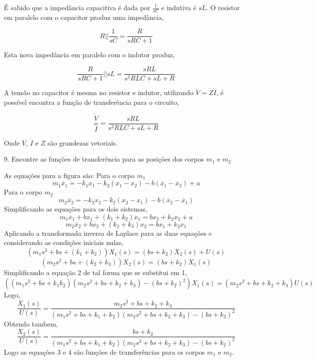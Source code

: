 \documentclass[paper=a4, fontsize=11pt]{article}
\begin{document}
É sabido que a impedância capacitiva é dada por $\frac{1}{s C}$ e indutiva é $s L $. O resistor
em paralelo com o capacitor produz uma impedância,

$$
R || \frac{1}{s C} = \frac{R}{s R C + 1}
$$

Esta nova impedância em paralelo com o indutor produz,

$$
\frac{R}{s R C + 1} || s L = \frac{s R L}{s^2 R L C + s L + R}
$$

A tensão no capacitor é mesma no resistor e indutor, utilizando $\dot{V}=\dot{Z}\dot{I}$,
é possível encontra a função de transferência para o circuito,

$$
\frac{\dot{V}}{\dot{I}} = \frac{s R L}{s^2 R L C + s L + R}
$$

Onde $\dot{V}$, $\dot{I}$ e $\dot{Z}$ são grandezas vetoriais.

\newpage

9. Encontre as funções de transferência para as posições dos corpos $m_1$ e $m_2$ 

As equações para a figura são:
Para o corpo $m_1$
$$
m_1 \ddot{x_1} = - k_1 x_1 - k_2(x_1 - x_2) - b(\dot{x_1} - \dot{x_2}) + u
$$
Para o corpo $m_2$
$$
m_2 \ddot{x_2} = -k_3 x_2 - k_2(x_2-x_1) - b(\dot{x_2} - \dot{x_1})
$$
Simplificando as equações para os dois sistemas,
$$
m_1 \ddot{x_1} + b \dot{x_1} + (k_1 + k_2) x_1 = b \dot{x_2} + k_2 x_2 + u
$$
$$
m_2 \ddot{x_2} + b \dot{x_2} + (k_2 + k_3) x_2 = b \dot{x_1} +  k_2 x_1
$$
Aplicando a transformada inversa de Laplace para as duas equações e considerando
as condições iniciais nulas,
\begin{equation}
(m_1 s^2 + b s + (k_1 + k_2))X_1(s) = (b s + k_2)X_2(s) + U(s)
\end{equation}
\begin{equation}
(m_2 s^2 + b s + (k_2 + k_3))X_2(s) = (b s + k_2) X_1(s)
\end{equation}
Simplificando a equação 2 de tal forma que se substitui em 1,
$$
((m_1 s^2 +  b s + k_1 k_2)(m_2 s^2 + b s + k_2 + k_3)-(b s + k_2)^2)X_1(s) = (m_2 s^2 +  b s + k_2 + k_3)U(s)
$$
Logo,
\begin{equation}
    \frac{X_1(s)}{U(s)} = \frac{m_2 s^2 + b s + k_2 + k_3}{(m_1 s^2 + b s + k_1 + k_2)(m_2 s^2 + b s + k_2 + k_3) - (b s +  k_2)^2}
\end{equation}
Obtendo tambem,
\begin{equation}
    \frac{X_2(s)}{U(s)} = \frac{b s + k_2}{(m_1 s^2 + b s +  k_1 + k_2)(m_2 s^2 + b s +  k_2 + k_3) - (b s + k_2 )^2}
\end{equation}
Logo as equações 3 e 4 são funções de transferências para os corpos $m_1$ e $m_2$.
\newpage
\end{document}
